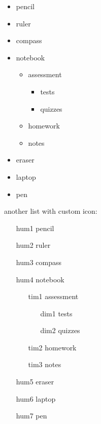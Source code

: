 \documentclass[10pt]{article}
\begin{document}
\begin{itemize}
\item pencil
\item ruler
\item compass
\item notebook
	\begin{itemize}
	\item assessment
		\begin{itemize}
		\item tests
		\item quizzes
		\end{itemize}
	\item homework
	\item notes
	\end{itemize}
\item eraser
\item laptop
\item pen
\end{itemize}

another list with custom icon:\\
\begin{enumerate}
\item[hum1] pencil
\item[hum2] ruler
\item[hum3] compass
\item[hum4] notebook
	\begin{enumerate}
	\item[tim1] assessment
		\begin{enumerate}
		\item[dim1] tests
		\item[dim2] quizzes
		\end{enumerate}
	\item[tim2] homework
	\item[tim3] notes
	\end{enumerate}
\item[hum5] eraser
\item[hum6] laptop
\item[hum7] pen
\end{enumerate}
\end{document}

